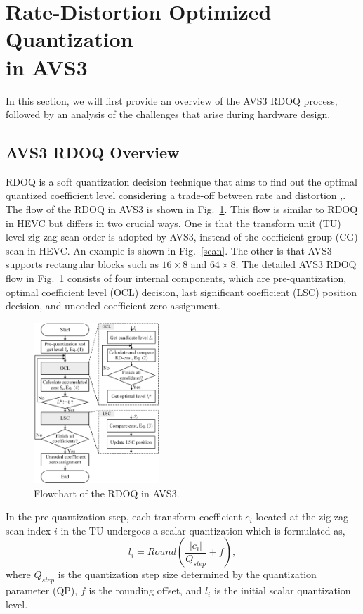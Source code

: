 \documentclass[lettersize,journal]{IEEEtran}
\begin{document}
\section{Rate-Distortion Optimized Quantization \\ in AVS3}
\label{sec:2}
In this section, we will first provide an overview of the AVS3 RDOQ process, followed by an analysis of the challenges that arise during hardware design. 
\subsection{AVS3 RDOQ Overview}
\label{sec:2A}
RDOQ is a soft quantization decision technique that aims to find out the optimal quantized coefficient level considering a trade-off between rate and distortion  \cite{zhao2023scanline},\cite{huang2023rate}. The flow of the RDOQ in AVS3 is shown in Fig.~\ref{rdoq process}. This flow is similar to RDOQ in HEVC \cite{cui2017Laplacedistributionbased} but differs in two crucial ways. One is that the transform unit (TU) level zig-zag scan order is adopted by AVS3, instead of the coefficient group (CG) scan in HEVC. An example is shown in Fig.~\ref{scan}. The other is that AVS3 supports rectangular blocks such as $16\times8$ and $64\times8$. The detailed AVS3 RDOQ flow in Fig.~\ref{rdoq process} consists of four internal components, which are pre-quantization, optimal coefficient level (OCL) decision, last significant coefficient (LSC) position decision, and uncoded coefficient zero assignment. 
\par
\begin{figure}[!t]
	\centering
	\centerline{\includegraphics[width=0.42\textwidth]{figure/OriRDOQ.png}} 
	\caption{Flowchart of the RDOQ in AVS3.}
	\label{rdoq process} %
\end{figure}
In the pre-quantization step, each transform coefficient $c_{i}$ located at the zig-zag scan index $i$ in the TU undergoes a scalar quantization which is formulated as, 
\begin{equation}
\label{round}
l _{i} = Round\left ( \frac{\left | c_{i}  \right | }{Q_{step} } +  f \right ),
\end{equation}
where $Q_{step}$ is the quantization step size determined by the quantization parameter (QP), $f$ is the rounding offset, and $l _{i}$ is the initial scalar quantization level. 
\end{document}

